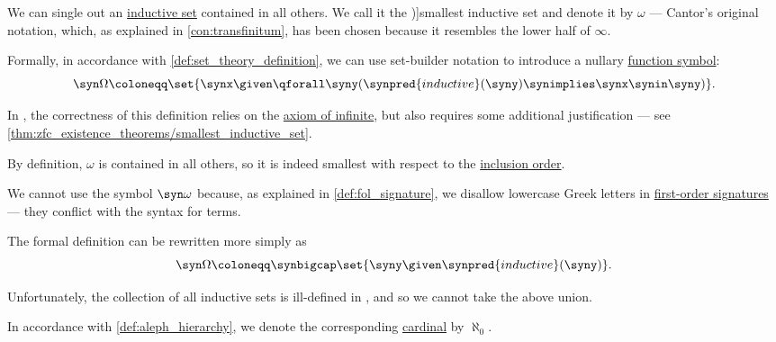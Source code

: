 \begin{definition}\label{def:smallest_inductive_set}
  We can single out an \hyperref[def:inductive_set]{inductive set} contained in all others. We call it the \term[en=smallest inductive set (\cite[13]{Jech2006SetTheory})]{smallest inductive set} and denote it by \( \omega \) --- Cantor's original notation, which, as explained in \cref{con:transfinitum}, has been chosen because it resembles the lower half of \( \infty \).

  Formally, in accordance with \cref{def:set_theory_definition}, we can use set-builder notation to introduce a nullary \hyperref[def:fol_signature/function]{function symbol}:
  \begin{equation*}
    \syn\Omega \coloneqq \set{ \synx \given \qforall \syny (\synpred{inductive}(\syny) \synimplies \synx \synin \syny) }.
  \end{equation*}
\end{definition}
\begin{comments}
  \item In \hyperref[def:zfc]{}, the correctness of this definition relies on the \hyperref[def:zfc/infinity]{axiom of infinite}, but also requires some additional justification --- see \cref{thm:zfc_existence_theorems/smallest_inductive_set}.

  \item By definition, \( \omega \) is contained in all others, so it is indeed smallest with respect to the \hyperref[def:inclusion_order]{inclusion order}.

  \item We cannot use the symbol \( \syn\omega \) because, as explained in \cref{def:fol_signature}, we disallow lowercase Greek letters in \hyperref[def:fol_signature]{first-order signatures} --- they conflict with the syntax for terms.

  \item The formal definition can be rewritten more simply as
  \begin{equation*}
    \syn\Omega \coloneqq \synbigcap \set{ \syny \given \synpred{inductive}(\syny) }.
  \end{equation*}

  Unfortunately, the collection of all inductive sets is ill-defined in , and so we cannot take the above union.

  \item In accordance with \cref{def:aleph_hierarchy}, we denote the corresponding \hyperref[def:cardinal]{cardinal} by \( \aleph_0 \).
\end{comments}


